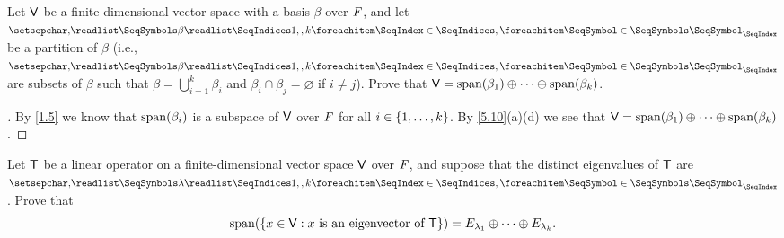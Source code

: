 \begin{ex}\label{ex:5.2.21}
	Let \(\mathsf{V}\) be a finite-dimensional vector space with a basis \(\beta\) over \(\mathit{F}\), and let \(\seq{\beta}{1,,k}\) be a partition of \(\beta\)
	(i.e., \(\seq{\beta}{1,,k}\) are subsets of \(\beta\) such that \(\beta = \bigcup_{i = 1}^k \beta_i\) and \(\beta_i \cap \beta_j = \varnothing\) if \(i \neq j\)).
	Prove that \(\V = \spn{\beta_1} \oplus \cdots \oplus \spn{\beta_k}\).
\end{ex}

\begin{proof}[]
	By \cref{1.5} we know that \(\spn{\beta_i}\) is a subspace of \(\mathsf{V}\) over \(\mathit{F}\) for all \(i \in \left\lbrace1, \dots, k\right\rbrace\).
	By \cref{5.10}(a)(d) we see that \(\V = \spn{\beta_1} \oplus \cdots \oplus \spn{\beta_k}\).
\end{proof}

\begin{ex}\label{ex:5.2.22}
	Let \(\mathsf{T}\) be a linear operator on a finite-dimensional vector space \(\mathsf{V}\) over \(\mathit{F}\), and suppose that the distinct eigenvalues of \(\mathsf{T}\) are \(\seq{\lambda}{1,,k}\).
	Prove that
	\[
		\spn{\set{x \in \V : x \text{ is an eigenvector of } \T}} = E_{\lambda_1} \oplus \cdots \oplus E_{\lambda_k}.
	\]
\end{ex}


